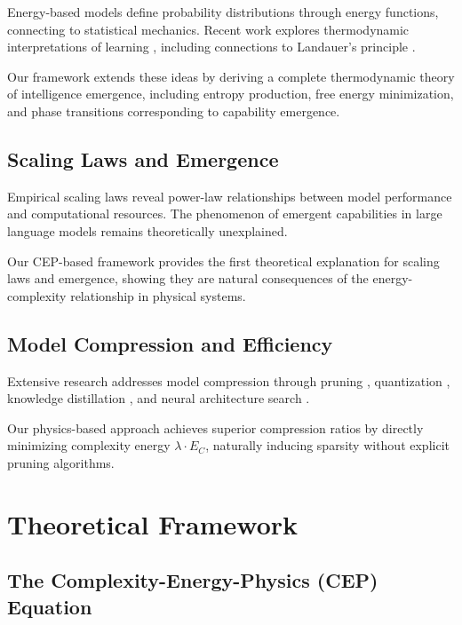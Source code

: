 \documentclass[12pt]{article}
\begin{document}
Energy-based models \cite{lecun2006tutorial,song2021train} define probability distributions through energy functions, connecting to statistical mechanics. Recent work explores thermodynamic interpretations of learning \cite{lynn2022broken,yang2023training}, including connections to Landauer's principle \cite{landauer1961irreversibility}.

Our framework extends these ideas by deriving a complete thermodynamic theory of intelligence emergence, including entropy production, free energy minimization, and phase transitions corresponding to capability emergence.

\subsection{Scaling Laws and Emergence}

Empirical scaling laws \cite{kaplan2020scaling,hoffmann2022training} reveal power-law relationships between model performance and computational resources. The phenomenon of emergent capabilities \cite{wei2022emergent} in large language models remains theoretically unexplained.

Our CEP-based framework provides the first theoretical explanation for scaling laws and emergence, showing they are natural consequences of the energy-complexity relationship in physical systems.

\subsection{Model Compression and Efficiency}

Extensive research addresses model compression through pruning \cite{lecun1989optimal,han2015learning}, quantization \cite{hubara2016quantized,jacob2018quantization}, knowledge distillation \cite{hinton2015distilling,gou2021knowledge}, and neural architecture search \cite{elsken2019neural,zoph2018learning}.

Our physics-based approach achieves superior compression ratios by directly minimizing complexity energy $\lambda \cdot E_C$, naturally inducing sparsity without explicit pruning algorithms.

\section{Theoretical Framework}

\subsection{The Complexity-Energy-Physics (CEP) Equation}
\end{document}
